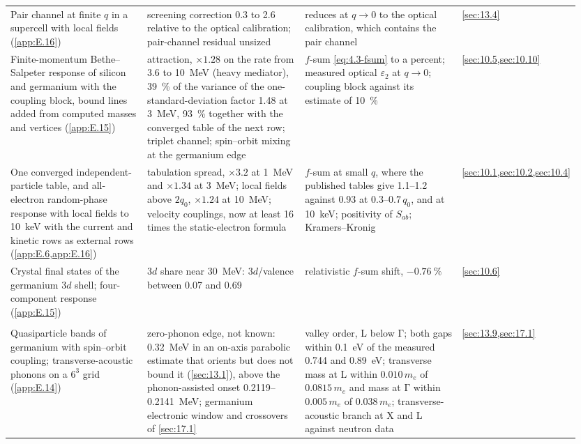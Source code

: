 {\begin{longtable}{@{}>{\raggedright\arraybackslash}p{0.25\linewidth}>{\raggedright\arraybackslash}p{0.305\linewidth}>{\raggedright\arraybackslash}p{0.305\linewidth}>{\raggedright\arraybackslash}p{0.09\linewidth}@{}}
  Pair channel at finite $q$ in a supercell with local fields (\cref{app:E.16}) & screening correction 0.3 to 2.6 relative to the optical calibration; pair-channel residual unsized & reduces at $q \to 0$ to the optical calibration, which contains the pair channel & \cref{sec:13.4} \\
  Finite-momentum Bethe--Salpeter response of silicon and germanium with the coupling block, bound lines added from computed masses and vertices (\cref{app:E.15}) & attraction, $\times1.28$ on the rate from 3.6 to \SI{10}{MeV} (heavy mediator), \SI{39}{\percent} of the variance of the one-standard-deviation factor 1.48 at \SI{3}{MeV}, \SI{93}{\percent} together with the converged table of the next row; triplet channel; spin--orbit mixing at the germanium edge & $f$-sum \cref{eq:4.3-fsum} to a percent; measured optical $\varepsilon_2$ at $q \to 0$; coupling block against its estimate of \SI{10}{\percent} & \cref{sec:10.5,sec:10.10} \\
  One converged independent-particle table, and all-electron random-phase response with local fields to \SI{10}{keV} with the current and kinetic rows as external rows (\cref{app:E.6,app:E.16}) & tabulation spread, $\times3.2$ at \SI{1}{MeV} and $\times1.34$ at \SI{3}{MeV}; local fields above $2q_0$, $\times1.24$ at \SI{10}{MeV}; velocity couplings, now at least 16 times the static-electron formula & $f$-sum at small $q$, where the published tables give 1.1--1.2 against 0.93 at 0.3--$0.7\,q_0$, and at \SI{10}{keV}; positivity of $S_{ab}$; Kramers--Kronig & \cref{sec:10.1,sec:10.2,sec:10.4} \\
  Crystal final states of the germanium $3d$ shell; four-component response (\cref{app:E.15}) & $3d$ share near \SI{30}{MeV}: $3d$/valence between 0.07 and 0.69 & relativistic $f$-sum shift, $-\SI{0.76}{\percent}$ & \cref{sec:10.6} \\
  \midrule
  \multicolumn{4}{@{}l}{\emph{Germanium window}} \\
  Quasiparticle bands of germanium with spin--orbit coupling; transverse-acoustic phonons on a $6^3$ grid (\cref{app:E.14}) & zero-phonon edge, not known: \SI{0.32}{MeV} in an on-axis parabolic estimate that orients but does not bound it (\cref{sec:13.1}), above the phonon-assisted onset 0.2119--\SI{0.2141}{MeV}; germanium electronic window and crossovers of \cref{sec:17.1} & valley order, L below $\mathrm{\Gamma}$; both gaps within \SI{0.1}{eV} of the measured 0.744 and \SI{0.89}{eV}; transverse mass at L within $0.010\,m_e$ of $0.0815\,m_e$ and mass at $\mathrm{\Gamma}$ within $0.005\,m_e$ of $0.038\,m_e$; transverse-acoustic branch at X and L against neutron data & \cref{sec:13.9,sec:17.1} \\

\end{longtable}}
